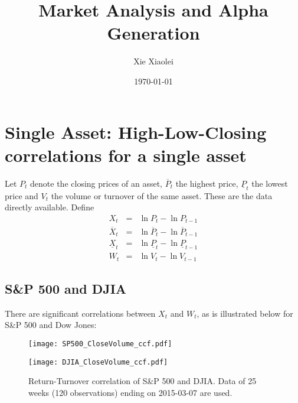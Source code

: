 \documentclass{article}
\title{Market Analysis and Alpha Generation}
\author{Xie Xiaolei}
\date{\today}
\begin{document}
\maketitle

\section{Single Asset: High-Low-Closing correlations for a single asset}
Let $P_t$ denote the closing prices of an asset, $\overline P_t$ the
highest price, $\underline P_t$ the lowest price and $V_t$ the volume
or turnover of the same asset. These are the data directly
available. Define
\begin{eqnarray*}
  X_t &=& \ln P_{t} - \ln P_{t-1} \\
  \overline X_t &=& \ln \overline P_{t} - \ln \overline P_{t-1} \\
  \underline X_t &=& \ln \underline P_{t} - \ln \underline P_{t-1} \\
  W_t &=& \ln V_t - \ln V_{t-1}
\end{eqnarray*}

\subsection{S\&P 500 and DJIA}
There are significant correlations between $X_t$ and $W_t$, as is
illustrated below for S\&P 500 and Dow Jones:
\begin{figure}[!htb]
\begin{minipage}{0.5\linewidth}
  \texttt{[image: SP500\_CloseVolume\_ccf.pdf]}
\end{minipage}\hfill
\begin{minipage}{0.5\linewidth}
  \texttt{[image: DJIA\_CloseVolume\_ccf.pdf]}
\end{minipage}
\caption{Return-Turnover correlation of S\&P 500 and DJIA. Data of 25
  weeks (120 observations) ending on 2015-03-07 are used.}
\end{figure}
\end{document}
